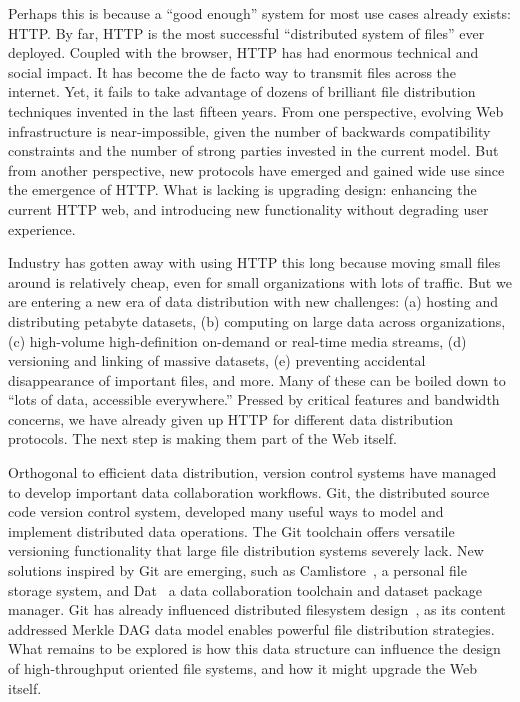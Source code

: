 \documentclass{sig-alternate}
\begin{document}
Perhaps this is because a ``good enough'' system for most use cases already exists: HTTP.  By far, HTTP is the most successful ``distributed system of files'' ever deployed. Coupled with the browser, HTTP has had enormous technical and social impact. It has become the de facto way to transmit files across the internet. Yet, it fails to take advantage of dozens of brilliant file distribution techniques invented in the last fifteen years. From one perspective, evolving Web infrastructure is near-impossible, given the number of backwards compatibility constraints and the number of strong parties invested in the current model. But from another perspective, new protocols have emerged and gained wide use since the emergence of HTTP. What is lacking is upgrading design: enhancing the current HTTP web, and introducing new functionality without degrading user experience.

Industry has gotten away with using HTTP this long because moving small files around is relatively cheap, even for small organizations with lots of traffic. But we are entering a new era of data distribution with new challenges: (a) hosting and distributing petabyte datasets, (b) computing on large data across organizations, (c) high-volume high-definition on-demand or real-time media streams, (d) versioning and linking of massive datasets, (e) preventing accidental disappearance of important files, and more. Many of these can be boiled down to ``lots of data, accessible everywhere.'' Pressed by critical features and bandwidth concerns, we have already given up HTTP for different data distribution protocols. The next step is making them part of the Web itself.

Orthogonal to efficient data distribution, version control systems have managed to develop important data collaboration workflows. Git, the distributed source code version control system, developed many useful ways to model and implement distributed data operations. The Git toolchain offers versatile versioning functionality that large file distribution systems severely lack. New solutions inspired by Git are emerging, such as Camlistore~\cite{Camlistore}, a personal file storage system, and Dat~\cite{Dat} a data collaboration toolchain and dataset package manager. Git has already influenced distributed filesystem design~\cite{mashtizadeh13}, as its content addressed Merkle DAG data model enables powerful file distribution strategies. What remains to be explored is how this data structure can influence the design of high-throughput oriented file systems, and how it might upgrade the Web itself.
\end{document}
